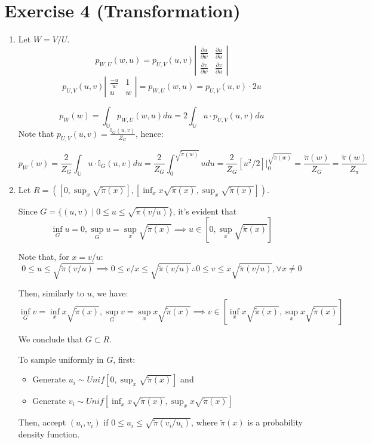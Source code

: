 \documentclass[12pt,letterpaper]{article}
\begin{document}
\section*{Exercise 4 (Transformation)}
\begin{enumerate}[leftmargin=!,labelindent=5pt]

	\item Let $W = V/U$.
	$$p_{W,U}(w,u) = p_{U,V}(u,v)
	\left|\begin{array}{ccc}
	\frac{\partial u}{\partial w} & \frac{\partial u}{\partial u}
	\\
	\frac{\partial v}{\partial w} & \frac{\partial v}{\partial u}
	\end{array}\right|$$ 
	$$p_{U,V}(u,v)
	\left|\begin{array}{ccc}
	\frac{-u}{w} & 1
	\\
	u & w
	\end{array}\right| = 
	p_{W,U}(w,u) = p_{U,V}(u,v)\cdot 2u $$

	$$ p_W(w) = \int_{\mathbb{U}}p_{W,U}(w,u)du =
	2\int_{\mathbb{U}}u\cdot p_{U,V}(u,v)du$$
	Note that $p_{U,V}(u,v) = \frac{\mathbb{I}_G(u,v)}{Z_G}$, hence:

	$$ p_W(w) =
	\frac{2}{Z_G}\int_{\mathbb{U}}u\cdot \mathbb{I}_G(u,v)du = 
	\frac{2}{Z_G}\int_{0}^{\sqrt{\tilde{\pi}(w)}}u du =
	\frac{2}{Z_G}[u^2/2]\Bigr|_0^{\sqrt{\tilde{\pi}(w)}} =
	\frac{\tilde{\pi}(w)}{Z_G} = \frac{\tilde{\pi}(w)}{Z_\pi} 
	$$

	\item Let $R = \left(\left[
	0, \sup_x\sqrt{\tilde{\pi}(x)}
	\right],
	\left[
	\inf_x x\sqrt{\tilde{\pi}(x)}, \sup_x\sqrt{\tilde{\pi}(x)}
	\right]
	\right)$.

	Since
	$G = \{ (u,v) \mid 0 \leq u \leq \sqrt{\tilde{\pi}(v/u)}\}$,
	it's evident that
	$$\inf_G u = 0, \sup_G u = \sup_x \sqrt{\tilde{\pi}(x)}
	\implies u \in [0, \sup_x \sqrt{\tilde{\pi}(x)}]$$

	Note that, for $x = v/u$:
	$$0 \leq u \leq \sqrt{\tilde{\pi}(v/u)} \implies
	 0 \leq  v/x \leq \sqrt{\tilde{\pi}(v/u)} \therefore
	 0 \leq v \leq x \sqrt{\tilde{\pi}(v/u)}, \forall x \neq 0
	$$ 

	Then, similarly to $u$, we have:
	$$\inf_G v = \inf_x x\sqrt{\tilde{\pi}(x)},
	\sup_G v = \sup_x x\sqrt{\tilde{\pi}(x)}
	\implies v \in
	[\inf_x x\sqrt{\tilde{\pi}(x)},\sup_x x\sqrt{\tilde{\pi}(x)}]$$

	We conclude that $G \subset R$.

	To sample uniformly in $G$, first:
	\begin{itemize}
	\item Generate $u_i \sim Unif[0, \sup_x \sqrt{\tilde{\pi}(x)}]$ and
	\item Generate $v_i \sim Unif[\inf_x x\sqrt{\tilde{\pi}(x)},
	\sup_x x\sqrt{\tilde{\pi}(x)}]$
	\end{itemize}
	Then, accept $(u_i,v_i)$ if
	$0 \leq u_i \leq \sqrt{\tilde{\pi}(v_i/u_i)}$, where
	$\tilde{\pi}(x)$ is a probability density function.


\end{enumerate}
\end{document}

